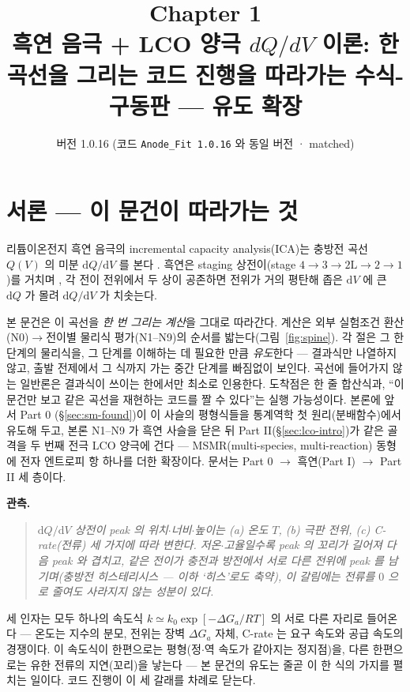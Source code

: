 \documentclass[11pt,a4paper]{article}
\title{\textbf{\LARGE Chapter 1}\\[0.35em]\Large 흑연 음극 + LCO 양극 $dQ/dV$ 이론: 한 곡선을 그리는 코드 진행을 따라가는 수식-구동판 — 유도 확장}
\author{}
\date{\normalsize 버전 1.0.16 \quad(코드 \texttt{Anode\_Fit 1.0.16} 와 동일 버전 · matched)}
\newcommand{\dd}{\mathrm{d}}
\begin{document}
\maketitle

\section*{서론 — 이 문건이 따라가는 것}
리튬이온전지 흑연 음극의 incremental capacity analysis(ICA)는 충방전 곡선 $Q(V)$ 의 미분
$\dd Q/\dd V$ 를 본다 \cite{bloom2005,dubarry2012}. 흑연은 staging 상전이(stage
$4\!\to\!3\!\to\!2\mathrm L\!\to\!2\!\to\!1$)를 거치며 \cite{dahn1991,ohzuku1993}, 각 전이 전위에서
두 상이 공존하면 전위가 거의 평탄해 좁은 $\dd V$ 에 큰 $\dd Q$ 가 몰려 $\dd Q/\dd V$ 가 치솟는다.

본 문건은 이 곡선을 \emph{한 번 그리는 계산}을 그대로 따라간다. 계산은 외부 실험조건 환산(N0)$\to$전이별
물리식 평가(N1--N9)의 순서를 밟는다(그림~\ref{fig:spine}). 각 절은 그 한 단계의 물리식을, 그 단계를 이해하는 데 필요한 만큼
\emph{유도}한다 — 결과식만 나열하지 않고, 출발 전제에서 그 식까지 가는 중간 단계를 빠짐없이 보인다. 곡선에 들어가지 않는 일반론은 결과식이 쓰이는 한에서만 최소로 인용한다. 도착점은 한 줄
합산식과, ``이 문건만 보고 같은 곡선을 재현하는 코드를 짤 수 있다''는 실행 가능성이다. 본론에 앞서 Part 0
(\S\ref{sec:sm-found})이 이 사슬의 평형식들을 통계역학 첫 원리(분배함수)에서 유도해 두고, 본론 N1--N9 가 흑연
사슬을 닫은 뒤 Part II(\S\ref{sec:lco-intro})가 같은 골격을 두 번째 전극 LCO 양극에 건다 — MSMR(multi-species,
multi-reaction) 동형에 전자 엔트로피 항 하나를 더한 확장이다. 문서는 Part 0 $\to$ 흑연(Part I) $\to$ Part II 세 층이다.

\textbf{관측.}
\begin{quote}\itshape
$\dd Q/\dd V$ 상전이 peak 의 위치$\cdot$너비$\cdot$높이는 (a) 온도 $T$, (b) 극판 전위, (c) C-rate(전류)
세 가지에 따라 변한다. 저온$\cdot$고율일수록 peak 의 꼬리가 길어져 다음 peak 와 겹치고, 같은 전이가 충전과 방전에서
서로 다른 전위에 peak 를 남기며(충방전 히스테리시스 — 이하 `히스'로도 축약), 이 갈림에는 전류를 $0$ 으로 줄여도 사라지지 않는 성분이 있다.
\end{quote}

세 인자는 모두 하나의 속도식 $k\simeq k_0\exp[-\Delta G_a/RT]$ 의 서로 다른 자리로 들어온다 — 온도는 지수의 분모,
전위는 장벽 $\Delta G_a$ 자체, C-rate 는 요구 속도와 공급 속도의 경쟁이다. 이 속도식이 한편으로는 평형(정$\cdot$역
속도가 같아지는 정지점)을, 다른 한편으로는 유한 전류의 지연(꼬리)을 낳는다 — 본 문건의 유도는 줄곧 이 한 식의 가지를
펼치는 일이다. 코드 진행이 이 세 갈래를 차례로 닫는다.
\end{document}
